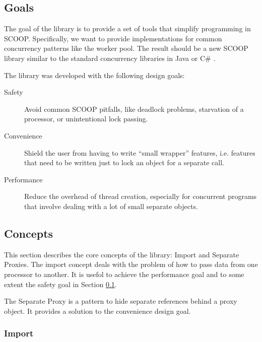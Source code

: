 \documentclass[a4paper,10pt]{article}
\begin{document}
\subsection{Goals}
\label{sec:goals}

The goal of the library is to provide a set of tools that simplify programming in SCOOP.
Specifically, we want to provide implementations for common concurrency patterns like the worker pool.
The result should be a new SCOOP library similar to the standard concurrency libraries in Java \cite{web:java-concurrency} or C\# \cite{web:ms-tpl}.

The library was developed with the following design goals:

\begin{description}
 \item [Safety]\label{item:safety} Avoid common SCOOP pitfalls, like deadlock problems, starvation of a processor, or unintentional lock passing.
 \item [Convenience]\label{item:convenience} Shield the user from having to write ``small wrapper'' features, i.e. features that need to be written just to lock an object for a separate call.
 \item [Performance]\label{item:performance} Reduce the overhead of thread creation, especially for concurrent programs that involve dealing with a lot of small separate objects.
\end{description}

\subsection{Concepts}

This section describes the core concepts of the library: Import and Separate Proxies.
The import concept deals with the problem of how to pass data from one processor to another.
It is usefol to achieve the performance goal and to some extent the safety goal in Section \ref{sec:goals}.

The Separate Proxy  is a pattern to hide separate references behind a proxy object.
It provides a solution to the convenience design goal.

\subsubsection{Import}
\label{sec:concepts:import}
\end{document}

